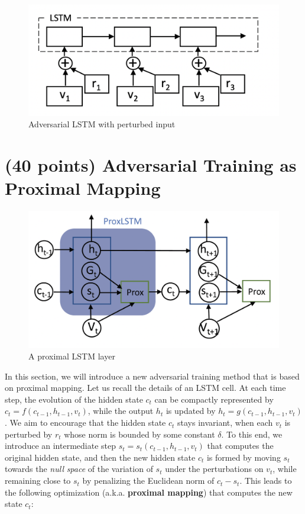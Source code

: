 \documentclass[11pt]{report}
\begin{document}
\begin{figure}[t]
	\centering
	\includegraphics[width=0.55\linewidth]{AdvLSTM.png}
	\caption{Adversarial LSTM with perturbed input}
	\label{fig:advLSTM}
\end{figure}

\section{(40 points) Adversarial Training as Proximal Mapping}

\begin{figure}[t]
	\centering
	\includegraphics[width=0.5\linewidth]{ProxLSTM.png}
	\caption{A proximal LSTM layer}
	\label{fig:proxLSTM}
\end{figure}

In this section, we will introduce a new adversarial training method that is based on proximal mapping. 
Let us recall the details of an LSTM cell.
At each time step, the evolution of the hidden state $c_t$ can be compactly represented by
$c_t = f(c_{t-1}, h_{t-1}, v_t)$,
while the output $h_t$ is updated by $h_t = g(c_{t-1}, h_{t-1}, v_t)$. 
We aim to encourage that the hidden state $c_t$ stays invariant, 
when each $v_t$ is perturbed by $r_t$ whose norm is bounded by some constant $\delta$.
To this end, we introduce an intermediate step 
$s_t = s_t(c_{t-1}, h_{t-1}, v_t)$ that computes the original hidden state,
and then the new hidden state $c_t$ is formed by moving $s_t$ towards the \emph{null} \emph{space} of the variation of $s_t$ under the perturbations on $v_t$,
while remaining close to $s_t$ by penalizing the Euclidean norm of $c_t - s_t$.
This leads to the following optimization (a.k.a. \textbf{proximal mapping}) that computes the new state $c_t$:
\end{document}

